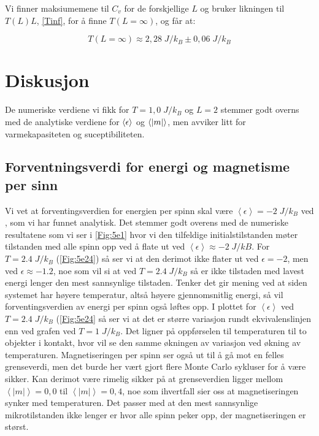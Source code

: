 \documentclass[reprint,english,notitlepage]{revtex4-2}  %
\begin{document}
Vi finner maksiumemene til $C_v$ for de forskjellige $L$ og bruker likningen til $T\left ( L \right ) L$, \eqref{Tinf}, for å finne $T \left ( L = \infty \right )$, og får at:

$$ T \left ( L = \infty \right ) \approx 2,28 \; J/k_B \pm 0,06 \; J/k_B$$

\section{Diskusjon}

De numeriske verdiene vi fikk for $T = 1,0 \; J/k_B$ og $L = 2$ stemmer godt overns med de analytiske verdiene for $\expval{\epsilon}$ og $\expval{|m|}$, men avviker litt for varmekapasiteten og suceptibiliteten.

\subsection*{Forventningsverdi for energi og magnetisme per sinn}

Vi vet at forventingsverdien for energien per spinn skal være $\left < \epsilon \right > = -2 \; J/k_B$ ved , som vi har funnet analytisk. Det stemmer godt overens med de numeriske resultatene som vi ser i \autoref{Fig:5e1} hvor vi den tilfeldige initialstilstanden møter tilstanden med alle spinn opp ved å flate ut ved $\left < \epsilon \right > \approx -2 \; J/kB$. For $T = 2.4 \; J/k_B$ (\autoref{Fig:5e24}) så ser vi at den derimot ikke flater ut ved $ \epsilon = -2$, men ved $\epsilon \approx -1.2 $, noe som vil si at ved $T = 2.4 \; J/k_B$ så er ikke tilstaden med lavest energi lenger den mest sannsynlige tilstaden. Tenker det gir mening ved at siden systemet har høyere temperatur, altså høyere gjennomsnitlig energi, så vil forventingsverdien av energi per spinn også løftes opp. I plottet for $\left < \epsilon \right >$ ved $T = 2.4  \; J/k_B$ (\autoref{Fig:5e24} så ser vi at det er større variasjon rundt ekvivalenslinjen enn ved grafen ved $T = 1 \; J/k_B$. Det ligner på oppførselen til temperaturen til to objekter i kontakt, hvor vil se den samme økningen av variasjon ved økning av temperaturen. Magnetiseringen per spinn ser også ut til å gå mot en felles grenseverdi, men det burde her vært gjort flere Monte Carlo sykluser for å være sikker. Kan derimot være rimelig sikker på at grenseverdien ligger mellom $\left < | m | \right > = 0,0$ til $\left < | m | \right > = 0,4$, noe som ihvertfall sier oss at magnetiseringen synker med temperaturen. Det passer med at den mest sannsynlige mikrotilstanden ikke lenger er hvor alle spinn peker opp, der magnetiseringen er størst.
\end{document}
